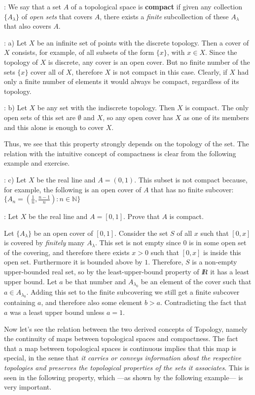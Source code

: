 : We say that a set $A$ of a topological space is {\bf compact} if given any collection
$\{A_{\lambda}\}$ of {\it open sets} that covers $A$, there exists a {\it finite}
subcollection of these $A_{\lambda}$ that also covers $A$.

\ejem: a) Let $X$ be an infinite set of points with the discrete topology.
Then a cover of $X$ consists, for example, of all subsets of the form $\{x\}$, with $x \in X$. Since the topology of $X$ is
discrete, any cover is an open cover. But no finite number of the sets $\{x\}$
cover all of $X$, therefore $X$ is not compact in this case.
Clearly, if $X$ had only a finite number of elements
it would always be compact, regardless of its topology.

\ejem: b) Let $X$ be any set with the indiscrete topology.
Then $X$ is compact. The only open sets of this set are
$\emptyset$ and $X$, so any open cover has $X$ as
one of its members and this alone is enough to cover $X$.

Thus, we see that this property strongly depends on the topology
of the set. The relation with the intuitive concept of compactness
is clear from the following example and exercise.

\ejem: c) Let $X$ be the real line and $A = (0,1)$. This subset is not compact
because, for example, the following is an open cover of $A$ that has no finite subcover: $\{ A_n = (\frac{1}{n}, \frac{n-1}{n}) \colon n \in \mathbb{N}\}$

\ejer: Let $X$ be the real line and $A = [0,1]$. Prove that $A$ is compact.

\bpru

Let $\{A_{\lambda}\}$ be an open cover of $[0,1]$. 
Consider the set $S$ of all $x$ such that $[0,x]$ is covered by \textit{finitely} many $A_\lambda$. This set is not empty since $0$ is in some open set of the covering, and therefore there exists $x > 0$ such that $[0,x]$ is inside this open set. Furthermore it is bounded above by $1$.
Therefore, $S$ is a non-empty upper-bounded real set, so by the least-upper-bound property of $\mbox{\sl {l$\!\!\!\;\:\!$R}}$ it has a least upper bound. Let $a$ be that number and $A_{\lambda_0}$ be an element of the cover such that $a \in A_{\lambda_0}$. Adding this set to the finite subcovering we still get a finite subcover containing $a$, and therefore also some element $b>a$. Contradicting the fact that $a$ was a least upper bound unless $a=1$.

\epru

Now let's see the relation between the two derived concepts of
Topology, namely the continuity of maps between topological
spaces and compactness. The fact that a map between
topological spaces is continuous implies that this map is special,
in the sense that {\it it carries or conveys information about the respective
topologies and preserves the topological properties of the sets
it associates}. This is seen in the following property, which ---as shown by
the following example--- is very important.

